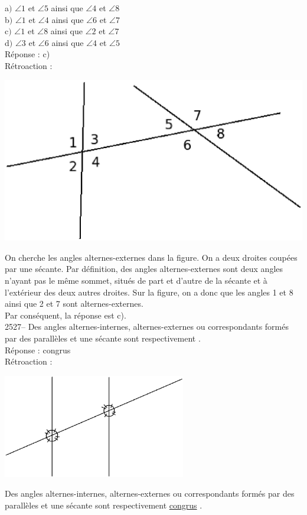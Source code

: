 \documentclass[letterpaper, 12pt]{article}
\begin{document}
a$)$ $\angle1$ et $\angle5$ ainsi que $\angle4$ et $\angle8$\\
b$)$ $\angle1$ et $\angle4$ ainsi que $\angle6$ et $\angle7$\\
c$)$ $\angle1$ et $\angle8$ ainsi que $\angle2$ et $\angle7$\\
d$)$ $\angle3$ et $\angle6$ ainsi que $\angle4$ et $\angle5$\\

R\'eponse : c)\\

R\'etroaction :\\
\begin{center}
 \includegraphics[width=8 cm,bb=0 474 591 842]{Q2524.eps}
\end{center}
On cherche les angles alternes-externes dans la figure. On a deux droites coup\'ees par une s\'ecante. Par d\'efinition, des angles alternes-externes sont deux angles n'ayant pas le m\^eme sommet, situ\'es de part et d'autre de la s\'ecante et \`a l'ext\'erieur des deux autres droites. Sur la figure, on a donc que les angles 1 et 8 ainsi que 2 et 7 sont alternes-externes.\\
Par cons\'equent, la r\'eponse est c).\\

2527-- Des angles alternes-internes, alternes-externes ou correspondants form\'es par des parall\`eles et une s\'ecante sont respectivement \underline{\qquad\qquad} .\\

R\'eponse : congrus\\

R\'etroaction :\\
\begin{center}
 \includegraphics[width=8cm,bb=0 474 591 842]{Q2527.eps}
\end{center}
Des angles alternes-internes, alternes-externes ou correspondants form\'es par des parall\`eles et une s\'ecante sont respectivement \underline{congrus} .\\
\end{document}
